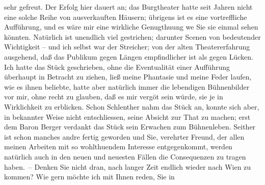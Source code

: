 \begin{ledgroupsized}[t]{13cm}
               sehr gefreut. Der Erfolg hier dauert an; das Burgtheater hatte seit Jahren nicht eine solche Reihe von ausverkauften
               Häusern; übrigens ist es eine vortreffliche Aufführung, und es wäre mir eine
               wirkliche Genugthuung we{\geminationn} Sie sie einmal sehen könnten.
               Natürlich ist unendlich viel gestrichen; darunter Scenen von bedeutender Wichtigkeit
               – und ich selbst war der Streicher; von der alten Theatererfahrung ausgehend, daß das
               Publikum gegen Längen empfindlicher ist als gegen Lücken. Ich hatte das Stück
               geschrieben, ohne die Eventualität einer Aufführung überhaupt in Betracht zu ziehen,
               ließ meine Phantasie und meine Feder laufen, wie es ihnen beliebte, {\pb}hatte aber natürlich immer die lebendigen
               Bühnenbilder vor mir, ohne recht zu glauben, daß es mir vergö{\geminationn}t sein würde, sie je in Wirklichkeit zu erblicken.
               Schon Schlenther nahm das Stück an, konnte sich aber, in bekannter
               Weise nicht entschliessen, seine Absicht zur That zu machen; erst dem Baron Berger verdankt  das Stück sein
               Erwachen zum Bühnenleben. Seither ist schon manches andre fertig geworden und Sie,
               verehrter Freund, der allen meinen Arbeiten mit so wohlthuendem Interesse
               entgegenkommt, werden natürlich auch in den neuen und neuesten Fällen die
               Consequenzen zu tragen haben. –\pend
           \pstart
           Denken Sie nicht dran, nach langer Zeit endlich wieder nach Wien zu kommen? Wie gern möchte ich mit Ihnen reden, Sie in

\end{ledgroupsized}
